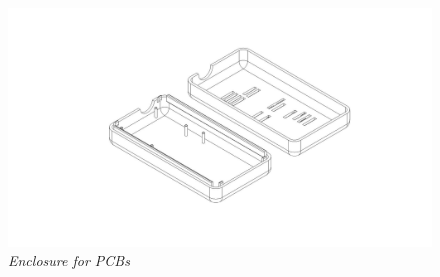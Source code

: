 \documentclass[8pt,compress]{beamer}
\begin{document}
\begin{frame}
\begin{minipage}{0.45\textwidth}
\begin{figure}
      \includegraphics[width=\textwidth]{assets/electronic/psperi_enclosure_final_testpic2.jpg}
      \caption{\it Enclosure for PCBs}
    \end{figure}
  \end{minipage}
\end{frame}

\end{document}
